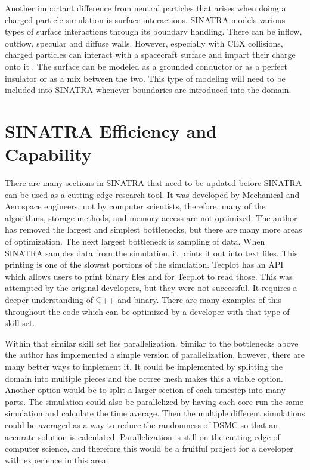 \indent Another important difference from neutral particles that arises when doing a charged particle simulation is surface interactions. SINATRA models various types of surface interactions through its boundary handling. There can be inflow, outflow, specular and diffuse walls. However, especially with CEX collisions, charged particles can interact with a spacecraft surface and impart their charge onto it \cite{surface_charge}. The surface can be modeled as a grounded conductor or as a perfect insulator or as a mix between the two. This type of modeling will need to be included into SINATRA whenever boundaries are introduced into the domain.

\section{SINATRA Efficiency and Capability}

There are many sections in SINATRA that need to be updated before SINATRA can be used as a cutting edge research tool. It was developed by Mechanical and Aerospace engineers, not by computer scientists, therefore, many of the algorithms, storage methods, and memory access are not optimized. The author has removed the largest and simplest bottlenecks, but there are many more areas of optimization. The next largest bottleneck is sampling of data. When SINATRA samples data from the simulation, it prints it out into text files. This printing is one of the slowest portions of the simulation. Tecplot has an API which allows users to print binary files and for Tecplot to read those. This was attempted by the original developers, but they were not successful. It requires a deeper understanding of C++ and binary. There are many examples of this throughout the code which can be optimized by a developer with that type of skill set. \par

\indent Within that similar skill set lies parallelization. Similar to the bottlenecks above the author has implemented a simple version of parallelization, however, there are many better ways to implement it. It could be implemented by splitting the domain into multiple pieces and the octree mesh makes this a viable option. Another option would be to split a larger section of each timestep into many parts. The simulation could also be parallelized by having each core run the same simulation and calculate the time average. Then the multiple different simulations could be averaged as a way to reduce the randomness of DSMC so that an accurate solution is calculated. Parallelization is still on the cutting edge of computer science, and therefore this would be a fruitful project for a developer with experience in this area. \par

